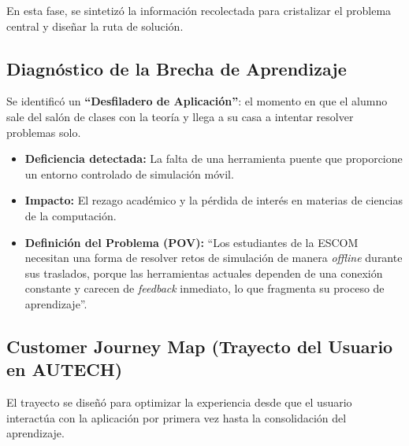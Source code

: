 En esta fase, se sintetizó la información recolectada para cristalizar el problema central y
diseñar la ruta de solución.

\subsection{Diagnóstico de la Brecha de Aprendizaje}
\label{subsec:diagnostico}

Se identificó un \textbf{``Desfiladero de Aplicación''}: el momento en que el alumno sale del
salón de clases con la teoría y llega a su casa a intentar resolver problemas solo.

\begin{itemize}
    \item \textbf{Deficiencia detectada:} La falta de una herramienta puente que proporcione un
    entorno controlado de simulación móvil.
    \item \textbf{Impacto:} El rezago académico y la pérdida de interés en materias de ciencias de
    la computación.
    \item \textbf{Definición del Problema (POV):} ``Los estudiantes de la ESCOM necesitan una
    forma de resolver retos de simulación de manera \textit{offline} durante sus traslados, porque
    las herramientas actuales dependen de una conexión constante y carecen de \textit{feedback}
    inmediato, lo que fragmenta su proceso de aprendizaje''.
\end{itemize}

\subsection{Customer Journey Map (Trayecto del Usuario en AUTECH)}
\label{subsec:journey_map}

El trayecto se diseñó para optimizar la experiencia desde que el usuario interactúa con la
aplicación por primera vez hasta la consolidación del aprendizaje.

